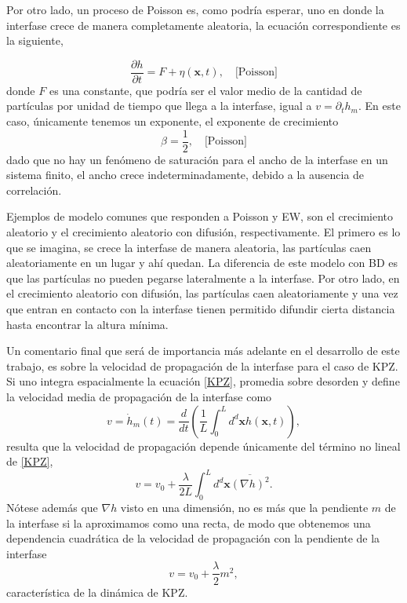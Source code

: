 Por otro lado, un proceso de Poisson es, como podría esperar, uno en donde la interfase crece de manera completamente aleatoria, la ecuación correspondiente es la siguiente,

\begin{equation}
    \frac{\partial h}{\partial t} = F + \eta(\mathbf{x},t), \quad \text{[Poisson]}
    \label{Poisson}
\end{equation}  
donde $F$ es una constante, que podría ser el valor medio de la cantidad de partículas por unidad de tiempo que llega a la interfase, igual a $v = \partial_t h_m$. En este caso, únicamente tenemos un exponente, el exponente de crecimiento
\begin{equation}
    \beta = \frac{1}{2}, \quad \text{[Poisson]}
\end{equation}
dado que no hay un fenómeno de saturación para el ancho de la interfase en un sistema finito, el ancho crece indeterminadamente, debido a la ausencia de correlación.

Ejemplos de modelo comunes que responden a Poisson y EW, son el crecimiento aleatorio y el crecimiento aleatorio con difusión, respectivamente. El primero es lo que se imagina, se crece la interfase de manera aleatoria, las partículas caen aleatoriamente en un lugar y ahí quedan. La diferencia de este modelo con BD es que las partículas no pueden pegarse lateralmente a la interfase. Por otro lado, en el crecimiento aleatorio con difusión, las partículas caen aleatoriamente y una vez que entran en contacto con la interfase tienen permitido difundir cierta distancia hasta encontrar la altura mínima.

Un comentario final que será de importancia más adelante en el desarrollo de este trabajo, es sobre la velocidad de propagación de la interfase para el caso de KPZ. Si uno integra espacialmente la ecuación \ref{KPZ}, promedia sobre desorden y define la velocidad media de propagación de la interfase como
\begin{equation}
    v = \dot{h}_m(t) = \frac{d}{dt} \left(\frac{1}{L} \int_{0}^{L}d^d\mathbf{x} h(\mathbf{x},t) \right),
\end{equation}
resulta que la velocidad de propagación depende únicamente del término no lineal de \ref{KPZ}, 
\begin{equation}
    v = v_0 + \frac{\lambda}{2L} \int_0^L d^d\mathbf{x} \overline{\left(\nabla h\right)^2}.
    \label{v_kpz}
\end{equation}
Nótese además que $\nabla h$ visto en una dimensión, no es más que la pendiente $m$ de la interfase si la aproximamos como una recta, de modo que obtenemos una dependencia cuadrática de la velocidad de propagación con la pendiente de la interfase
\begin{equation}
    v = v_0 + \frac{\lambda}{2} m^2,
\end{equation}
característica de la dinámica de KPZ. 











